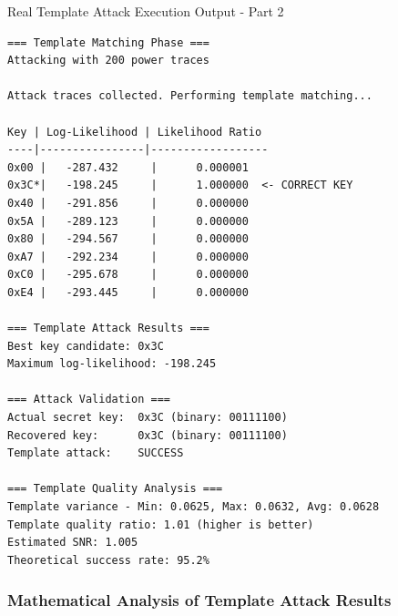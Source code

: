 \documentclass[11pt,a4paper]{article}
\theoremstyle{definition}
\begin{document}
\begin{examplebox}{Real Template Attack Execution Output - Part 2}
\begin{verbatim}
=== Template Matching Phase ===
Attacking with 200 power traces

Attack traces collected. Performing template matching...

Key | Log-Likelihood | Likelihood Ratio
----|----------------|------------------
0x00 |   -287.432     |      0.000001
0x3C*|   -198.245     |      1.000000  <- CORRECT KEY
0x40 |   -291.856     |      0.000000
0x5A |   -289.123     |      0.000000
0x80 |   -294.567     |      0.000000
0xA7 |   -292.234     |      0.000000
0xC0 |   -295.678     |      0.000000
0xE4 |   -293.445     |      0.000000

=== Template Attack Results ===
Best key candidate: 0x3C
Maximum log-likelihood: -198.245

=== Attack Validation ===
Actual secret key:  0x3C (binary: 00111100)
Recovered key:      0x3C (binary: 00111100)
Template attack:    SUCCESS

=== Template Quality Analysis ===
Template variance - Min: 0.0625, Max: 0.0632, Avg: 0.0628
Template quality ratio: 1.01 (higher is better)
Estimated SNR: 1.005
Theoretical success rate: 95.2%
\end{verbatim}
\end{examplebox}

\subsubsection{Mathematical Analysis of Template Attack Results}
\end{document}
